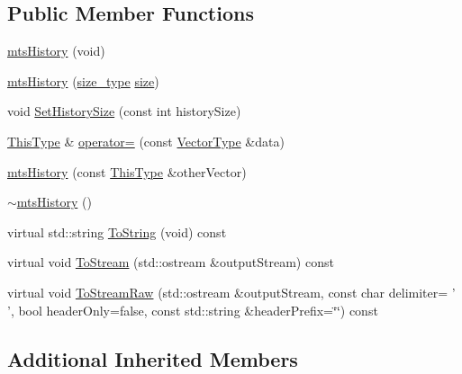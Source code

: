 \subsection*{Public Member Functions}
\begin{DoxyCompactItemize}
\item 
\hyperlink{classmts_history_ad99222e10e0961b5938b4ecbc2a77d4a}{mts\-History} (void)
\item 
\hyperlink{classmts_history_a0b0a6c292dc53619d138594f30d278b5}{mts\-History} (\hyperlink{classmts_history_aca985b1dbd39cc61816674edc9aee0cc}{size\-\_\-type} \hyperlink{classvct_dynamic_const_vector_base_a79950d8cced7fd4e790d9ac2ca1c43a7}{size})
\item 
void \hyperlink{classmts_history_a54b3dbc86d832adb007a36cc81c8ba24}{Set\-History\-Size} (const int history\-Size)
\item 
\hyperlink{classvct_dynamic_const_vector_base_a39da273523717f678f54d3321ebca3dd}{This\-Type} \& \hyperlink{classmts_history_a9d414d17927ef7f0ee2952014be86a54}{operator=} (const \hyperlink{classmts_history_a7ccb818e85025368eb6ccdb5423453a3}{Vector\-Type} \&data)
\item 
\hyperlink{classmts_history_a0b4dccf680335b32142db61583ea69e0}{mts\-History} (const \hyperlink{classvct_dynamic_const_vector_base_a39da273523717f678f54d3321ebca3dd}{This\-Type} \&other\-Vector)
\item 
\hyperlink{classmts_history_a0d9b57533e945c9f577f2cf1c9635c61}{$\sim$mts\-History} ()
\item 
virtual std\-::string \hyperlink{classmts_history_ab3afbb2532e89c7ed44aa6e6948d06d2}{To\-String} (void) const 
\item 
virtual void \hyperlink{classmts_history_ae2ea86c07b3aefc568c6f89ee6d5b2b6}{To\-Stream} (std\-::ostream \&output\-Stream) const 
\item 
virtual void \hyperlink{classmts_history_ac9942da54614bef7fd604bc1ec1b2593}{To\-Stream\-Raw} (std\-::ostream \&output\-Stream, const char delimiter= ' ', bool header\-Only=false, const std\-::string \&header\-Prefix=\char`\"{}\char`\"{}) const 
\end{DoxyCompactItemize}
\subsection*{Additional Inherited Members}


